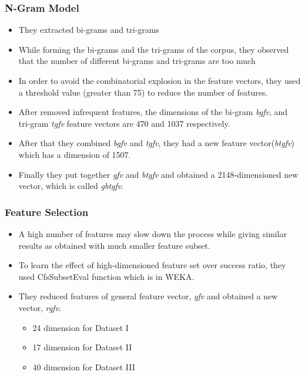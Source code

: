 \documentclass{beamer}
\begin{document}
 \begin{frame}
  \frametitle{N-Gram Model}
  \begin{itemize}
   \item They extracted bi-grams and tri-grams
   \item While forming the bi-grams and the tri-grams of the corpus, they observed that the number of different bi-grams and 
   tri-grams are too much
   \item In order to avoid the combinatorial explosion in the feature vectors, they used a threshold value (greater than 75) 
   to reduce the number of features.
   \item After removed infrequent features, the dimensions of the bi-gram \textit{bgfv}, and tri-gram \textit{tgfv} feature vectors 
   are 470 and 1037 respectively.
   \item After that they combined \textit{bgfv} and \textit{tgfv}, they had a new feature vector(\textit{btgfv}) which has a dimension 
   of 1507.
   \item Finally they put together \textit{gfv} and \textit{btgfv} and obtained a 2148-dimensioned new vector, which is called 
   \textit{gbtgfv}.
  \end{itemize}
 \end{frame}
 
 \begin{frame}
  \frametitle{Feature Selection}
  \begin{itemize}
   \item A high number of features may slow down the process while giving similar results as obtained with much smaller feature subset.
   \item To learn the effect of high-dimensioned feature set over success ratio, they used CfsSubsetEval function which is in WEKA.
   \item They reduced features of general feature vector, \textit{gfv} and obtained a new vector, \textit{rgfv}.
   \begin{itemize}
    \item 24 dimension for Dataset I
    \item 17 dimension for Dataset II
    \item 40 dimension for Dataset III
   \end{itemize}
  \end{itemize}
 \end{frame}
\end{document}
